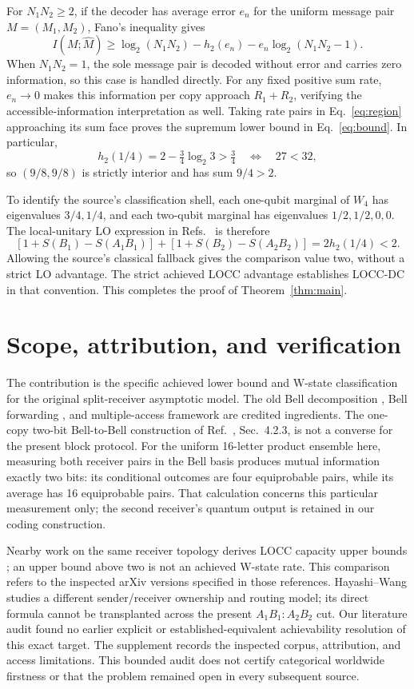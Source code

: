 \documentclass[11pt]{article}
\newcommand{\hbin}{h_2}
\begin{document}
For $N_1N_2\geq2$, if the decoder has average error $e_n$ for the uniform
message pair $M=(M_1,M_2)$, Fano's inequality gives
\begin{equation}\label{eq:fano}
 I(M;\widehat M)\geq\log_2(N_1N_2)-\hbin(e_n)
                         -e_n\log_2(N_1N_2-1).
\end{equation}
When $N_1N_2=1$, the sole message pair is decoded without error and carries
zero information, so this case is handled directly.
For any fixed positive sum rate, $e_n\to0$ makes this information per copy
approach $R_1+R_2$, verifying the accessible-information interpretation as
well. Taking rate pairs in Eq.~\eqref{eq:region} approaching its sum face
proves the supremum lower bound in Eq.~\eqref{eq:bound}. In particular,
\[
 \hbin(1/4)=2-\tfrac34\log_2 3>\tfrac34
 \quad\Longleftrightarrow\quad 27<32,
\]
so $(9/8,9/8)$ is strictly interior and has sum $9/4>2$.

To identify the source's classification shell, each one-qubit marginal of
$W_4$ has eigenvalues $3/4,1/4$, and each two-qubit marginal has eigenvalues
$1/2,1/2,0,0$. The local-unitary LO expression in
Refs.~\cite{bruss2004,bruss2006} is therefore
\[
 [1+S(B_1)-S(A_1B_1)]+[1+S(B_2)-S(A_2B_2)]
       =2\hbin(1/4)<2.
\]
Allowing the source's classical fallback gives the comparison value two,
without a strict LO advantage. The strict achieved LOCC advantage establishes
LOCC-DC in that convention. This completes the proof of Theorem~\ref{thm:main}.

\section{Scope, attribution, and verification}
The contribution is the specific achieved lower bound and W-state
classification for the original split-receiver asymptotic model.
The old Bell decomposition \cite{cao}, Bell forwarding \cite{pradhan},
and multiple-access framework \cite{huang,winter} are credited ingredients.
The one-copy two-bit Bell-to-Bell construction of Ref.~\cite{pradhan},
Sec.~4.2.3, is not a converse for the present block protocol. For the uniform
16-letter product ensemble here, measuring both receiver pairs in the Bell
basis produces mutual information exactly two bits: its conditional outcomes
are four equiprobable pairs, while its average has 16 equiprobable pairs.
That calculation concerns this particular measurement only; the second
receiver's quantum output is retained in our coding construction.

Nearby work on the same receiver topology derives LOCC capacity upper bounds
\cite{das,muhuri}; an upper bound above two is not an achieved W-state rate.
This comparison refers to the inspected arXiv versions specified in those
references. Hayashi--Wang \cite{hayashi} studies a different sender/receiver
ownership and routing model; its direct formula cannot be transplanted across
the present $A_1B_1:A_2B_2$ cut. Our literature audit found no earlier explicit
or established-equivalent achievability resolution of this exact target.
The supplement records the inspected corpus, attribution, and access
limitations. This bounded audit does not certify categorical worldwide
firstness or that the problem remained open in every subsequent source.
\end{document}
